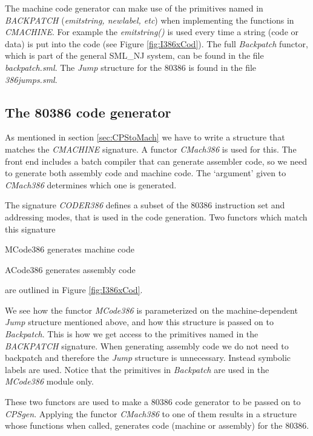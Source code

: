The machine code generator can make use of the primitives named in
{\em BACKPATCH\/} ({\em emitstring, newlabel, etc\/}) when
implementing the functions in {\em CMACHINE\/}. For example the {\em
emitstring()\/} is used every time a string (code or data) is put into
the code (see Figure \ref{fig:I386xCod}). The full {\em Backpatch\/}
functor, which is part of the general SML\_NJ system, can be found in
the file {\em backpatch.sml\/}. The {\em Jump\/} structure for the
80386 is found in the file {\em 386jumps.sml\/}.

\subsection{The 80386 code generator}

As mentioned in section \ref{sec:CPStoMach} we have to write a
structure that matches the {\em CMACHINE\/} signature. A functor {\em
CMach386} is used for this. The front end includes a batch compiler
that can generate assembler code, so we need to generate both assembly
code and machine code. The `argument' given to {\em CMach386}
determines which one is generated.

The signature {\em CODER386} defines a subset of the 80386
instruction set and addressing modes, that is used in the code
generation. Two functors which match this signature
\begin{descit}{MCode386} generates machine code \end{descit}
\begin{descit}{ACode386} generates assembly code \end{descit} 
are outlined in Figure \ref{fig:I386xCod}. 

We see how the functor {\em MCode386\/} is parameterized on the
machine-dependent {\em Jump\/} structure mentioned above, and how this
structure is passed on to {\em Backpatch\/}. This is how we get access
to the primitives named in the {\em BACKPATCH\/} signature. When
generating assembly code we do not need to backpatch and therefore the
{\em Jump\/} structure is unnecessary.  Instead symbolic labels are
used. Notice that the primitives in {\em Backpatch\/} are used in the
{\em MCode386} module only.

These two functors are used to make a 80386 code generator to be
passed on to {\em CPSgen\/}. Applying the functor {\em CMach386} to
one of them results in a structure whose functions when called,
generates code (machine or assembly) for the 80386.

